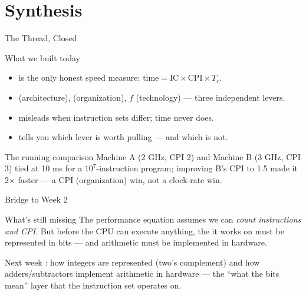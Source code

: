 \documentclass[aspectratio=169]{beamer}
\begin{document}

\section{Synthesis}

\begin{frame}{The Thread, Closed}
  \begin{block}{What we built today}
    \begin{itemize}
      \item {} is the only honest speed measure: $\text{time} =
        \text{IC} \times \text{CPI} \times T_c$.
      \item {} (architecture),  (organization), $f$
        (technology) --- three independent levers.
      \item {} misleads when instruction sets differ; time never does.
      \item {} tells you which lever is worth pulling --- and
        which is not.
    \end{itemize}
  \end{block}
  \begin{exampleblock}{The running comparison}
    Machine A (2 GHz, CPI 2) and Machine B (3 GHz, CPI 3) tied at 10 ms for a
    $10^7$-instruction program; improving B's CPI to 1.5 made it 2$\times$
    faster --- a CPI (organization) win, not a clock-rate win.
  \end{exampleblock}
\end{frame}

\begin{frame}{Bridge to Week 2}
  \begin{block}{What's still missing}
    The performance equation assumes we can \emph{count instructions and CPI}.
    But before the CPU can execute anything, the  it works on must be
    represented in bits --- and arithmetic must be implemented in hardware.
  \end{block}
  \begin{exampleblock}{Next week}
    : how integers are represented (two's complement) and
    how adders/subtractors implement arithmetic in hardware --- the ``what the
    bits mean'' layer that the instruction set operates on.
  \end{exampleblock}
\end{frame}
\end{document}
